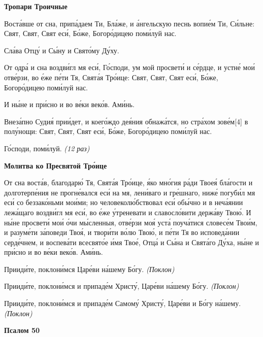 

\bfseries Тропари Троичные\normalfont{}


   Воста́вше от сна, припа́даем Ти, Бла́же, и а́нгельскую песнь вопие́м Ти,
Си́льне: Свят, Свят, Свят еси́, Бо́же, Богоро́дицею поми́луй нас.


   Сла́ва Отцу́ и Сы́ну и Свято́му Ду́ху.


   От одра́ и сна воздви́гл мя еси́, Го́споди, ум мой просвети́ и се́рдце, и
устне́ мои́ отве́рзи, во е́же пе́ти Тя, Свята́я Тро́ице: Свят, Свят, Свят еси́,
Бо́же, Богоро́дицею поми́луй нас.


   И ны́не и при́сно и во ве́ки веко́в. Ами́нь.


   Внеза́пно Судия́ прии́дет, и коего́ждо дея́ния обнажа́тся, но стра́хом
зове́м[4] в
полу́нощи: Свят, Свят, Свят еси́, Бо́же, Богоро́дицею поми́луй нас.


   Го́споди, поми́луй. \itshape (12 раз)\normalfont{}



 

\bfseries Молитва ко Пресвятой Тро́ице\normalfont{}


   От сна воста́в, благодарю́ Тя, Свята́я Тро́ице, я́ко мно́гия ра́ди Твоея́
бла́гости и долготерпе́ния не прогне́вался еси́ на мя, лени́ваго и гре́шнаго,
ниже́ погуби́л мя еси́ со беззако́ньми мои́ми; но человеколю́бствовал еси́
обы́чно и в неча́янии лежа́щаго воздви́гл мя еси́, во е́же у́треневати и
славосло́вити держа́ву Твою́. И ны́не просвети́ мои́ о́чи мы́сленныя, отве́рзи
моя́ уста́ поуча́тися словесе́м Твои́м, и разуме́ти за́поведи Твоя́, и твори́ти
во́лю Твою́, и пе́ти Тя во исповеда́нии серде́чнем, и воспева́ти всесвято́е и́мя
Твое́, Отца́ и Сы́на и Свята́го Ду́ха, ны́не и при́сно и во ве́ки веко́в.
Ами́нь.


   Прииди́те, поклони́мся Царе́ви на́шему Бо́гу. \itshape (Поклон)\normalfont{}


   Прииди́те, поклони́мся и припаде́м Христу́, Царе́ви на́шему Бо́гу.
\itshape (Поклон)\normalfont{}


   Прииди́те, поклони́мся и припаде́м Самому́ Христу́, Царе́ви и Бо́гу
на́шему. \itshape (Поклон)\normalfont{}



 

\bfseries Псалом 50\normalfont{}


